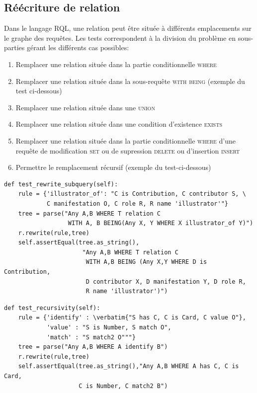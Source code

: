 \documentclass {report}
\begin{document}
\subsection{Réécriture de relation}
Dans le langage RQL, une relation peut être située à différents emplacements sur le graphe des requêtes. Les tests correspondent à la division du problème en sous-parties gérant les différents cas possibles:
\begin{enumerate}
\item Remplacer une relation située dans la partie conditionnelle \textsc{where}
\item Remplacer une relation située dans la sous-requête \textsc{with being} (exemple du test ci-dessous)
\item Remplacer une relation située dans une \textsc{union}
\item Remplacer une relation située dans une condition d'existence \textsc{exists}
\item Remplacer une relation située dans la partie conditionnelle \textsc{where} d'une requête de modification \textsc{set} ou de supression \textsc{delete} ou d'insertion \textsc{insert}
\item Permettre le remplacement récursif (exemple du test-ci-dessous)
\end{enumerate}
\renewcommand{\lstlistingname}{Test}

\begin{lstlisting}[caption= Relation située dans la sous-requête \textsc{with being}]
def test_rewrite_subquery(self):
    rule = {'illustrator_of': "C is Contribution, C contributor S, \
            C manifestation O, C role R, R name 'illustrator'"}
    tree = parse("Any A,B WHERE T relation C 
                  WITH A, B BEING(Any X, Y WHERE X illustrator_of Y)")
    r.rewrite(rule,tree)
    self.assertEqual(tree.as_string(),
                      "Any A,B WHERE T relation C 
                       WITH A,B BEING (Any X,Y WHERE D is Contribution, 
                       D contributor X, D manifestation Y, D role R,
                       R name 'illustrator')")
\end{lstlisting}


\begin{lstlisting}[caption= Remplacement récursif]
 def test_recursivity(self):
    rule = {'identify' : \verbatim{"S has C, C is Card, C value O"},
            'value' : "S is Number, S match O",
            'match' : "S match2 O"""}
    tree = parse("Any A,B WHERE A identify B")
    r.rewrite(rule,tree)
    self.assertEqual(tree.as_string(),"Any A,B WHERE A has C, C is Card, 
                     C is Number, C match2 B")
\end{lstlisting}
\end{document}
